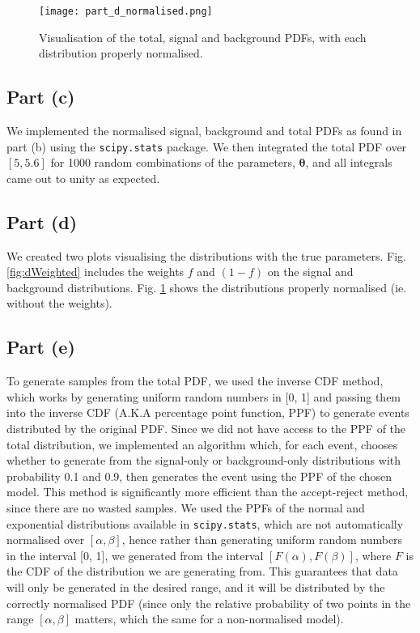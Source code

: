 \documentclass{article}
\begin{document}
\begin{figure}[h]
\centering
\texttt{[image: part\_d\_normalised.png]}
\caption{Visualisation of the total, signal and background PDFs, with each distribution properly normalised.}
\label{fig:dNorm}
\end{figure}

\subsection*{Part (c)}

We implemented the normalised signal, background and total PDFs as found in part (b) using the \texttt{scipy.stats} package. We then integrated the total PDF over $[5, 5.6]$ for 1000 random combinations of the parameters, $\boldsymbol{\theta}$, and all integrals came out to unity as expected. 

\subsection*{Part (d)}

We created two plots visualising the distributions with the true parameters. Fig. \ref{fig:dWeighted} includes the weights $f$ and $(1-f)$ on the signal and background distributions. Fig. \ref{fig:dNorm} shows the distributions properly normalised (ie. without the weights).  

\subsection*{Part (e)}

To generate samples from the total PDF, we used the inverse CDF method, which works by generating uniform random numbers in [0, 1] and passing them into the inverse CDF (A.K.A percentage point function, PPF) to generate events distributed by the original PDF. Since we did not have access to the PPF of the total distribution, we implemented an algorithm which, for each event, chooses whether to generate from the signal-only or background-only distributions with probability 0.1 and 0.9, then generates the event using the PPF of the chosen model. This method is significantly more efficient than the accept-reject method, since there are no wasted samples. We used the PPFs of the normal and exponential distributions available in \texttt{scipy.stats}, which are not automatically normalised over $[\alpha, \beta]$, hence rather than generating uniform random numbers in the interval [0, 1], we generated from the interval $[F(\alpha), F(\beta)]$, where $F$ is the CDF of the distribution we are generating from. This guarantees that data will only be generated in the desired range, and it will be distributed by the correctly normalised PDF (since only the relative probability of two points in the range $[\alpha, \beta]$ matters, which the same for a non-normalised model).
\end{document}
